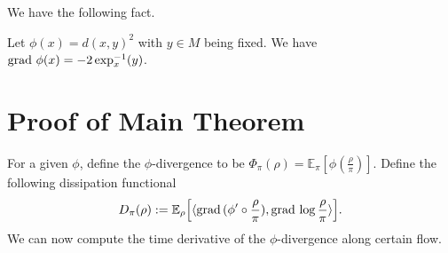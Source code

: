 We have the following fact. 
\begin{lemma}
    Let $\phi(x) = d(x, y)^{2}$ with $y \in M$ being fixed. 
    We have $\operatorname{grad\,} \phi(x) = -2 \exp_{x}^{-1}(y)$.
\end{lemma}



\section{Proof of Main Theorem}\label{Sec_Proof_Main_Theorem}

For a given $\phi$, 
define the $\phi$-divergence to be $\Phi_{\pi}(\rho) = \mathbb{E}_{\pi} [\phi(\frac{\rho}{\pi})]$.
Define the following dissipation functional
\begin{align*}
    D_{\pi}(\rho) := \mathbb{E}_{\rho} \left[ \langle \grad (\phi' \circ \frac{\rho}{\pi}) , 
        \grad \log \frac{\rho}{\pi} \rangle\right].
\end{align*}
We can now compute the time derivative of the $\phi$-divergence along certain flow.

